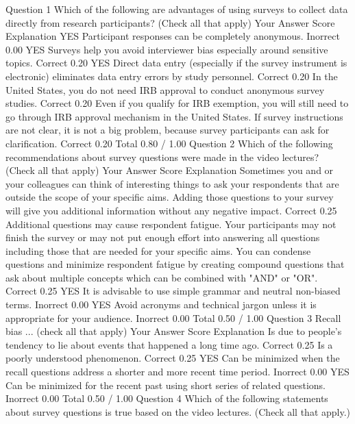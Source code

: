 Question 1
Which of the following are advantages of using surveys to collect data directly from research participants? (Check all that apply)
Your Answer		Score	Explanation
YES Participant responses can be completely anonymous.	Inorrect	0.00	
YES Surveys help you avoid interviewer bias especially around sensitive topics.	Correct	0.20	
YES Direct data entry (especially if the survey instrument is electronic) eliminates data entry errors by study personnel.	Correct	0.20	
In the United States, you do not need IRB approval to conduct anonymous survey studies.	Correct	0.20	Even if you qualify for IRB exemption, you will still need to go through IRB approval mechanism in the United States.
If survey instructions are not clear, it is not a big problem, because survey participants can ask for clarification.	Correct	0.20	
Total		0.80 / 1.00	
Question 2
Which of the following recommendations about survey questions were made in the video lectures? (Check all that apply)
Your Answer		Score	Explanation
Sometimes you and or your colleagues can think of interesting things to ask your respondents that are outside the scope of your specific aims. Adding those questions to your survey will give you additional information without any negative impact.	Correct	0.25	Additional questions may cause respondent fatigue. Your participants may not finish the survey or may not put enough effort into answering all questions including those that are needed for your specific aims.
You can condense questions and minimize respondent fatigue by creating compound questions that ask about multiple concepts which can be combined with "AND" or "OR".	Correct	0.25	
YES It is advisable to use simple grammar and neutral non-biased terms.	Inorrect	0.00	
YES Avoid acronyms and technical jargon unless it is appropriate for your audience.	Inorrect	0.00	
Total		0.50 / 1.00	
Question 3
Recall bias ... (check all that apply)
Your Answer		Score	Explanation
Is due to people's tendency to lie about events that happened a long time ago.	Correct	0.25	
Is a poorly understood phenomenon.	Correct	0.25	
YES Can be minimized when the recall questions address a shorter and more recent time period.	Inorrect	0.00	
YES Can be minimized for the recent past using short series of related questions.	Inorrect	0.00	
Total		0.50 / 1.00	
Question 4
Which of the following statements about survey questions is true based on the video lectures. (Check all that apply.)

